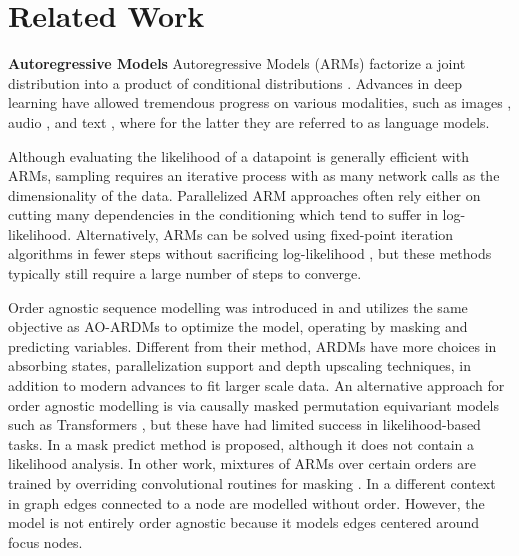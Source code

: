 \documentclass{article} \usepackage{iclr2022_conference,times}
\begin{document}
\section{Related Work}
\textbf{Autoregressive Models} \hspace{.2cm}
Autoregressive Models (ARMs) factorize a joint distribution into a product of conditional distributions \citep{bengio2000takingcurse,larochelle2011nade}. 
Advances in deep learning have allowed tremendous progress
on various modalities, such as images \citep[][i.a.]{oord2016pixelrnn,child2019sparsetransformer}, audio \citep[][i.a.]{oord2016wavenet,kalchbrenner2018efficientneural}, and text \citep[][i.a.]{bengio2003neural,graves2013rnn,melis2018on,merity2018regularizing,brown2020language}, where for the latter they are referred to as language models.


Although evaluating the likelihood of a datapoint is generally efficient with ARMs, sampling requires an iterative process with as many network calls as the dimensionality of the data. Parallelized ARM approaches often rely either on cutting many dependencies in the conditioning \citep{reed2017parallel} which tend to suffer in log-likelihood. Alternatively, ARMs can be solved using fixed-point iteration algorithms in fewer steps without sacrificing log-likelihood \citep{wiggers2020predictive,song2021acceleratingparallel}, but these methods typically still require a large number of steps to converge. 


Order agnostic sequence modelling was introduced in \citep{uria2014adeeptractable} and utilizes the same objective as AO-ARDMs to optimize the model, operating by masking and predicting variables. Different from their method, ARDMs have more choices in absorbing states, parallelization support and depth upscaling techniques, in addition to modern advances to fit larger scale data. An alternative approach for order agnostic modelling is via causally masked permutation equivariant models such as Transformers \citep{yang2019xlnet,alcorn2021DEformer}, but these have had limited success in likelihood-based tasks. In \citep{ghazvininejad2019maskpredict} a mask predict method is proposed, although it does not contain a likelihood analysis. In other work, mixtures of ARMs over certain orders are trained by overriding convolutional routines for masking  \citep{jain2020locallymasked}. In a different context in \citep{liu2018constrainedgraph} graph edges connected to a node are modelled without order. However, the model is not entirely order agnostic because it models edges centered around focus nodes.
\end{document}
